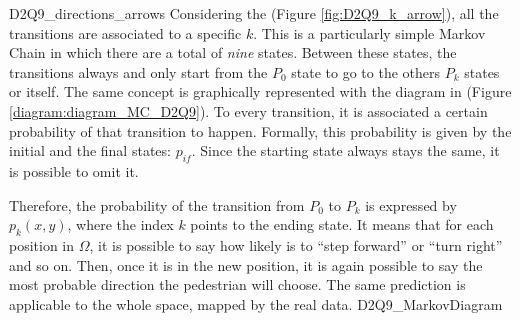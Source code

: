\documentclass[class=article, crop=false]{standalone}
\begin{document}
	{D2Q9_directions_arrows}
Considering the (Figure \ref{fig:D2Q9_k_arrow}), all the transitions are associated to a specific $k$. 
This is a particularly simple Markov Chain in which there are a total of \emph{nine} states. 
Between these states, the transitions always and only start from the $P_0$ state to go to the others $P_k$ states or itself. 
The same concept is graphically represented with the diagram in (Figure \ref{diagram:diagram_MC_D2Q9}). 
To every transition, it is associated a certain probability of that transition to happen. 
Formally, this probability is given by the initial and the final states: $p_{if}$. 
Since the starting state always stays the same, it is possible to omit it. 

Therefore, the probability of the transition from $P_0$ to $P_k$ is expressed by $p_k(x, y)$, where the index $k$ points to the ending state. 
It means that for each position in $\Omega$, it is possible to say how likely is to “step forward” or “turn right” and so on. 
Then, once it is in the new position, it is again possible to say the most probable direction the pedestrian will choose. 
The same prediction is applicable to the whole space, mapped by the real data.
	{D2Q9_MarkovDiagram}
\end{document}
